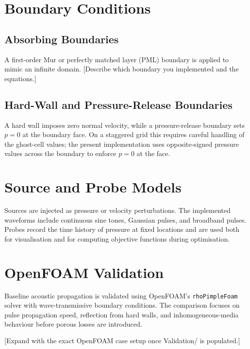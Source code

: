 \section{Boundary Conditions}
\label{sec:bcs}

\subsection{Absorbing Boundaries}
\label{subsec:absorbing}

A first-order Mur or perfectly matched layer (PML) boundary is applied to mimic an infinite domain. [Describe which boundary you implemented and the equations.]

\subsection{Hard-Wall and Pressure-Release Boundaries}
\label{subsec:wall_bc}

A hard wall imposes zero normal velocity, while a pressure-release boundary sets $p = 0$ at the boundary face. On a staggered grid this requires careful handling of the ghost-cell values; the present implementation uses opposite-signed pressure values across the boundary to enforce $p=0$ at the face.

\section{Source and Probe Models}
\label{sec:src_probe}

Sources are injected as pressure or velocity perturbations. The implemented waveforms include continuous sine tones, Gaussian pulses, and broadband pulses. Probes record the time history of pressure at fixed locations and are used both for visualisation and for computing objective functions during optimisation.

\section{OpenFOAM Validation}
\label{sec:openfoam_validation}

Baseline acoustic propagation is validated using OpenFOAM's \texttt{rhoPimpleFoam} solver with wave-transmissive boundary conditions. The comparison focuses on pulse propagation speed, reflection from hard walls, and inhomogeneous-media behaviour before porous losses are introduced.

[Expand with the exact OpenFOAM case setup once Validation/ is populated.]

